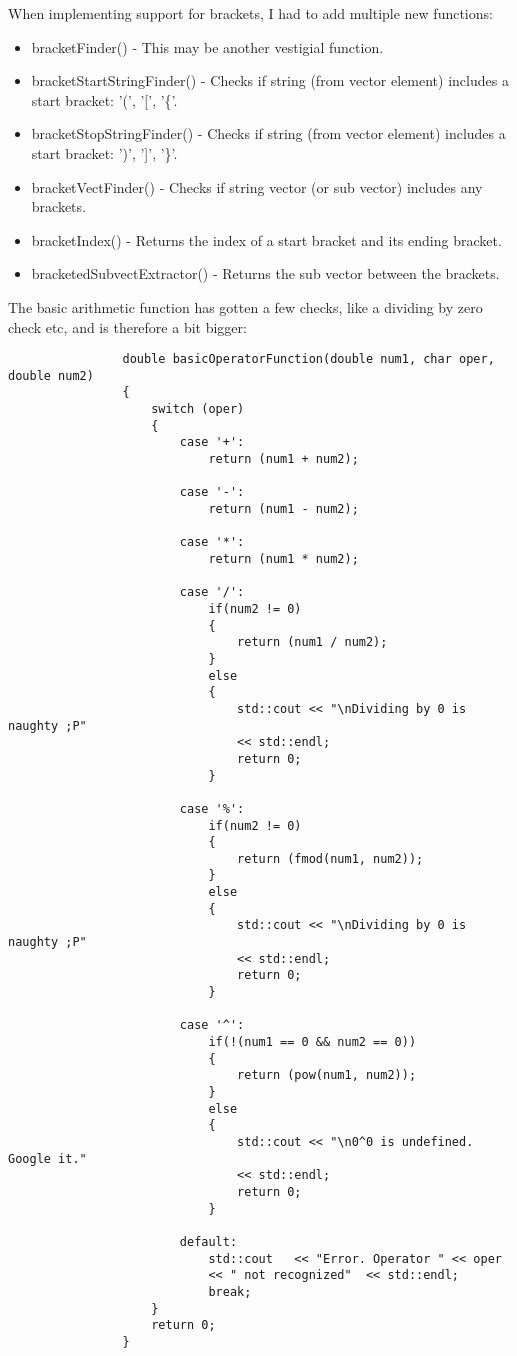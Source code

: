 \documentclass{article}
\begin{document}
			When implementing support for brackets, I had to add multiple new functions:
			\begin{itemize}
				\item bracketFinder()				- This may be another vestigial function.
				\item bracketStartStringFinder()	- Checks if string (from vector element) includes a start bracket: '(', '[', '\{'.
				\item bracketStopStringFinder()		- Checks if string (from vector element) includes a start bracket: ')', ']', '\}'.
				\item bracketVectFinder()			- Checks if string vector (or sub vector) includes any brackets.
				\item bracketIndex()				- Returns the index of a start bracket and its ending bracket.
				\item bracketedSubvectExtractor()	- Returns the sub vector between the brackets.
			\end{itemize}
			
			The basic arithmetic function has gotten a few checks, like a dividing by zero check etc, and is therefore a bit bigger:
			\begin{lstlisting}
				double basicOperatorFunction(double num1, char oper, double num2)
				{
					switch (oper)
					{
						case '+':
							return (num1 + num2);
						
						case '-':
							return (num1 - num2);
						
						case '*':
							return (num1 * num2);
						
						case '/':
							if(num2 != 0)
							{
								return (num1 / num2);
							}
							else
							{
								std::cout << "\nDividing by 0 is naughty ;P"
								<< std::endl;
								return 0;
							}
						
						case '%':
							if(num2 != 0)
							{
								return (fmod(num1, num2));
							}
							else
							{
								std::cout << "\nDividing by 0 is naughty ;P"
								<< std::endl;
								return 0;
							}
						
						case '^':
							if(!(num1 == 0 && num2 == 0))
							{
								return (pow(num1, num2));
							}
							else
							{
								std::cout << "\n0^0 is undefined. Google it."
								<< std::endl;
								return 0;
							}
						
						default:
							std::cout   << "Error. Operator " << oper
							<< " not recognized"  << std::endl;
							break;
					}
					return 0;
				}
			\end{lstlisting}
			
\end{document}
